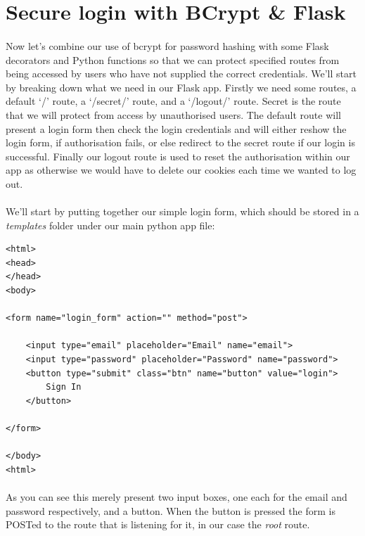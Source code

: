 \documentclass[12pt, a4paper, twoside]{book}
\begin{document}
\section{Secure login with BCrypt \& Flask}
\label{login}
\paragraph{} Now let's combine our use of bcrypt for password hashing with some Flask decorators and Python functions so that we can protect specified routes from being accessed by users who have not supplied the correct credentials. We'll start by breaking down what we need in our Flask app. Firstly we need some routes, a default `/' route, a `/secret/' route, and a `/logout/' route. Secret is the route that we will protect from access by unauthorised users. The default route will present a login form then check the login credentials and will either reshow the login form, if authorisation fails, or else redirect to the secret route if our login is successful. Finally our logout route is used to reset the authorisation within our app as otherwise we would have to delete our cookies each time we wanted to log out.

\paragraph{} We'll start by putting together our simple login form, which should be stored in a \emph{templates} folder under our main python app file:

\begin{lstlisting}
<html>
<head>
</head>
<body>

<form name="login_form" action="" method="post">

    <input type="email" placeholder="Email" name="email">
    <input type="password" placeholder="Password" name="password">
    <button type="submit" class="btn" name="button" value="login">
        Sign In
    </button>

</form>

</body>
<html>
\end{lstlisting}

\paragraph{} As you can see this merely present two input boxes, one each for the email and password respectively, and a button. When the button is pressed the form is POSTed to the route that is listening for it, in our case the \emph{root} route.
\end{document}
